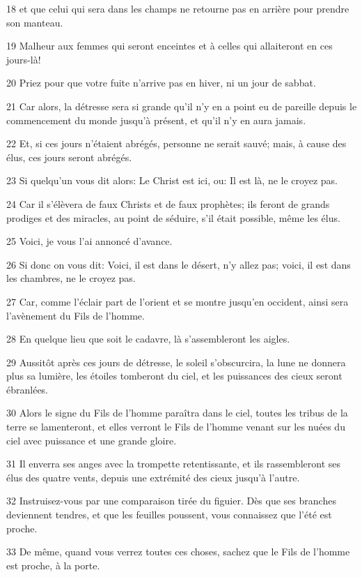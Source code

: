 \par 18 et que celui qui sera dans les champs ne retourne pas en arrière pour prendre son manteau.
\par 19 Malheur aux femmes qui seront enceintes et à celles qui allaiteront en ces jours-là!
\par 20 Priez pour que votre fuite n'arrive pas en hiver, ni un jour de sabbat.
\par 21 Car alors, la détresse sera si grande qu'il n'y en a point eu de pareille depuis le commencement du monde jusqu'à présent, et qu'il n'y en aura jamais.
\par 22 Et, si ces jours n'étaient abrégés, personne ne serait sauvé; mais, à cause des élus, ces jours seront abrégés.
\par 23 Si quelqu'un vous dit alors: Le Christ est ici, ou: Il est là, ne le croyez pas.
\par 24 Car il s'élèvera de faux Christs et de faux prophètes; ils feront de grands prodiges et des miracles, au point de séduire, s'il était possible, même les élus.
\par 25 Voici, je vous l'ai annoncé d'avance.
\par 26 Si donc on vous dit: Voici, il est dans le désert, n'y allez pas; voici, il est dans les chambres, ne le croyez pas.
\par 27 Car, comme l'éclair part de l'orient et se montre jusqu'en occident, ainsi sera l'avènement du Fils de l'homme.
\par 28 En quelque lieu que soit le cadavre, là s'assembleront les aigles.
\par 29 Aussitôt après ces jours de détresse, le soleil s'obscurcira, la lune ne donnera plus sa lumière, les étoiles tomberont du ciel, et les puissances des cieux seront ébranlées.
\par 30 Alors le signe du Fils de l'homme paraîtra dans le ciel, toutes les tribus de la terre se lamenteront, et elles verront le Fils de l'homme venant sur les nuées du ciel avec puissance et une grande gloire.
\par 31 Il enverra ses anges avec la trompette retentissante, et ils rassembleront ses élus des quatre vents, depuis une extrémité des cieux jusqu'à l'autre.
\par 32 Instruisez-vous par une comparaison tirée du figuier. Dès que ses branches deviennent tendres, et que les feuilles poussent, vous connaissez que l'été est proche.
\par 33 De même, quand vous verrez toutes ces choses, sachez que le Fils de l'homme est proche, à la porte.
